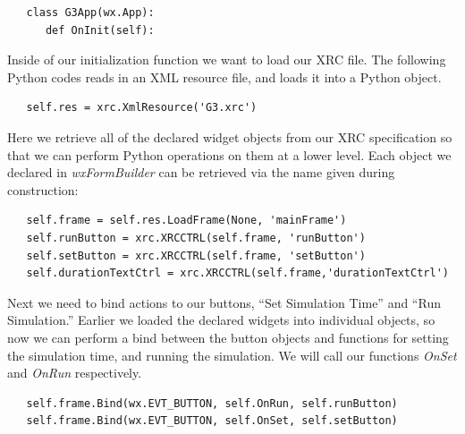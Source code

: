 \documentclass[12pt]{article}
\begin{document}
{\footnotesize
   \resetlinenumber[3]
   \linenumbers
 \begin{verbatim}
   class G3App(wx.App):
      def OnInit(self): 
 \end{verbatim}
}

Inside of our initialization function we want to load our XRC file. 
The following Python codes reads in an XML resource file, and loads
it into a Python object.

{\footnotesize
   \resetlinenumber[5]
   \linenumbers
 \begin{verbatim}
   self.res = xrc.XmlResource('G3.xrc')
 \end{verbatim}
}

Here we retrieve all of the declared widget objects from our XRC 
specification so that we can perform Python operations on them at a 
lower level. Each object we declared in {\it wxFormBuilder} can be retrieved 
via the name given during construction:

{\footnotesize
   \resetlinenumber[6]
   \linenumbers
 \begin{verbatim}
   self.frame = self.res.LoadFrame(None, 'mainFrame')
   self.runButton = xrc.XRCCTRL(self.frame, 'runButton')
   self.setButton = xrc.XRCCTRL(self.frame, 'setButton')
   self.durationTextCtrl = xrc.XRCCTRL(self.frame,'durationTextCtrl')
 \end{verbatim}
}

Next we need to bind actions to our buttons, ``Set Simulation Time'' 
and ``Run Simulation.'' Earlier we loaded the 
declared widgets into individual objects, so now we can perform
a bind between the button objects and functions for setting the
simulation time, and running the simulation. We will 
call our functions {\it OnSet} and {\it OnRun} respectively. 

{\footnotesize
   \resetlinenumber[10]
   \linenumbers
 \begin{verbatim}
   self.frame.Bind(wx.EVT_BUTTON, self.OnRun, self.runButton)
   self.frame.Bind(wx.EVT_BUTTON, self.OnSet, self.setButton)
 \end{verbatim} 
}


\end{document}
